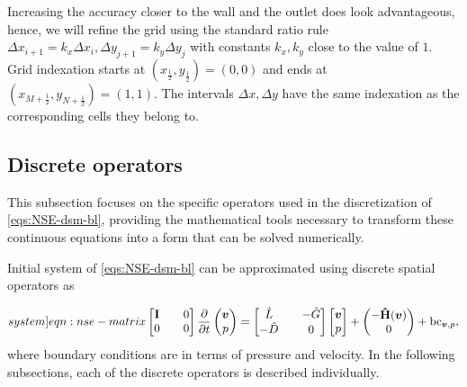 \documentclass{article}
\begin{document}
Increasing the accuracy closer to the wall and the outlet does look advantageous, hence, we will refine the grid using the standard ratio rule $\Delta x_{i+1}=k_x\Delta x_i,\Delta y_{j+1}=k_y\Delta y_j$ with constants $k_x,k_y$ close to the value of $1$. Grid indexation starts at $(x_{\frac{1}{2}},y_{\frac{1}{2}})=(0,0)$ and ends at $(x_{M+\frac{1}{2}},y_{N+\frac{1}{2}})=(1,1)$. The intervals $\Delta x, \Delta y$ have the same indexation as the corresponding cells they belong to. 

\subsection{Discrete operators}

This subsection focuses on the specific operators used in the discretization of \cref{eqs:NSE-dsm-bl}, providing the mathematical tools necessary to transform these continuous equations into a form that can be solved numerically.

Initial system of \cref{eqs:NSE-dsm-bl} can be approximated using discrete spatial operators as

\begin{equation}\label[system]{eqn:nse-matrix}
            \begin{bmatrix}
                  \mathbf{I} && 0 \\ 
                  0 && 0
            \end{bmatrix}
            \frac{\partial }{\partial t} 
            \begin{pmatrix}
                  \boldsymbol{v} \\ 
                  p
            \end{pmatrix}
            =
            \begin{bmatrix}
                  \hat{L} && - \hat{G} \\ 
                  -\hat{D} && 0
            \end{bmatrix}
            \begin{bmatrix}
                  \boldsymbol{v} \\
                  p
            \end{bmatrix}
            +
            \begin{pmatrix}
                  -\mathbf{\hat{H}}(\boldsymbol{v})\\
                  0
            \end{pmatrix} + \text{bc}_{\boldsymbol{v},p},
        \end{equation}
where boundary conditions are in terms of pressure and velocity. In the following subsections, each of the discrete operators is described individually. 
\end{document}
